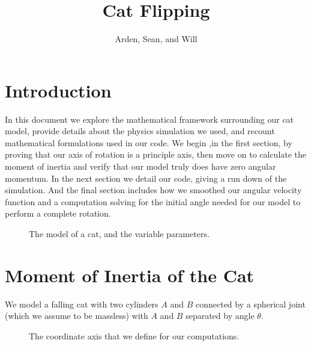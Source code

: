 \documentclass[12]{amsart}
\theoremstyle{definition}
\begin{document}
\title{Cat Flipping}
\author{Arden, Sean, and Will}
\maketitle

\section{Introduction}
In this document we explore the mathematical framework surrounding our cat model, provide details about the physics simulation we used, and recount mathematical formulations used in our code. We begin ,in the first section, by proving that our axis of rotation is a principle axis, then move on to calculate the moment of inertia and verify that our model truly does have zero angular momentum. In the next section we detail our code, giving a run down of the simulation. And the final section includes how we smoothed our angular velocity function and a computation solving for the initial angle needed for our model to perform a complete rotation. 

\begin{figure}[htpb]
  \centering
  
  \caption{The model of a cat, and the variable parameters.}%
  \label{fig:model}
\end{figure}

\section{Moment of Inertia of the Cat}
We model a falling cat with two cylinders $A$ and $B$ connected by a spherical joint (which we assume to be massless) with $A$ and $B$ separated by angle $\theta$.

\begin{figure}[htpb]
  \centering
  
  \caption{The coordinate axis that we define for our computations.}%
  \label{fig:axis}
\end{figure}
\end{document}
